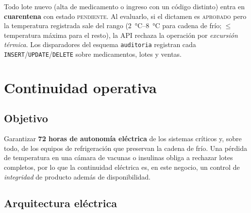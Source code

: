 \documentclass[11pt,a4paper,oneside]{report}
\newcommand{\cod}[1]{\texttt{\small #1}}
\begin{document}
Todo lote nuevo (alta de medicamento o ingreso con un código distinto) entra en
\textbf{cuarentena} con estado \textsc{pendiente}. Al evaluarlo, si el dictamen es
\textsc{aprobado} pero la temperatura registrada sale del rango
(\SIrange{2}{8}{\celsius} para cadena de frío; $\leq$ temperatura máxima para el resto),
la API rechaza la operación por \emph{excursión térmica}. Los disparadores del esquema
\cod{auditoria} registran cada \cod{INSERT}/\cod{UPDATE}/\cod{DELETE} sobre medicamentos,
lotes y ventas.

\chapter{Continuidad operativa}

\section{Objetivo}

Garantizar \textbf{72 horas de autonomía eléctrica} de los sistemas críticos y, sobre todo,
de los equipos de refrigeración que preservan la cadena de frío. Una pérdida de
temperatura en una cámara de vacunas o insulinas obliga a rechazar lotes completos, por lo
que la continuidad eléctrica es, en este negocio, un control de \emph{integridad} de
producto además de disponibilidad.

\section{Arquitectura eléctrica}
\end{document}
